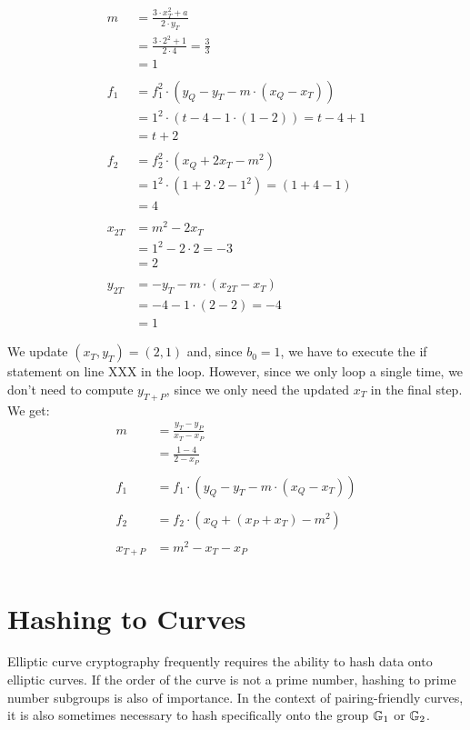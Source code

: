 \begin{example}
\begin{align*}
m & = \frac{3\cdot x_T^2 +a}{2\cdot y_T}\\
  & = \frac{3\cdot 2^2 +1}{2\cdot 4}
    = \frac{3}{3}\\
  & = 1\\
  \\
f_1 & = f_1^2\cdot (y_Q - y_T - m\cdot(x_Q-x_T)) \\
    & = 1^2\cdot (t - 4 - 1\cdot(1-2))
      = t-4+1\\
    & = t+2\\
    \\
f_2 & =  f_2^2\cdot (x_Q + 2x_T -m^2)\\
    & = 1^2\cdot (1 + 2\cdot 2 -1^2)
      = (1 + 4 -1)\\
    & = 4\\
\\  
x_{2T} & =  m^2 - 2 x_T\\
       & =  1^2 - 2\cdot 2
         = -3\\
       & = 2 \\  
\\
y_{2T} & = -y_T - m\cdot (x_{2T}-x_T)\\
       & = -4 - 1\cdot (2-2)
         = -4\\
       & = 1
\end{align*}

We update $(x_T,y_T) =(2,1)$ and, since $b_0=1$, we have to execute the if statement on line XXX in the  loop. However, since we only loop a single time, we don't need to compute $y_{T+P}$, since we only need the updated $x_T$ in the final step. We get:
\begin{align*}
m & =  \frac{y_T -y_P}{x_T - x_P}\\
  & =  \frac{1 -4}{2 - x_P}\\
\\
f_1 & = f_1\cdot (y_Q -y_T -m\cdot (x_Q - x_T))\\
\\
f_2 & = f_2\cdot (x_Q + (x_P+x_T) - m^2)\\
\\
x_{T+P} & = m^2 -x_T -x_P\\
\end{align*}
\end{example}


\section{Hashing to Curves} Elliptic curve cryptography frequently requires the ability to hash data onto elliptic curves. If the order of the curve is not a prime number, hashing to prime number subgroups is also of importance. In the context of pairing-friendly curves, it is also sometimes necessary to hash specifically onto the group $\mathbb{G}_1$ or $\mathbb{G}_2$.


